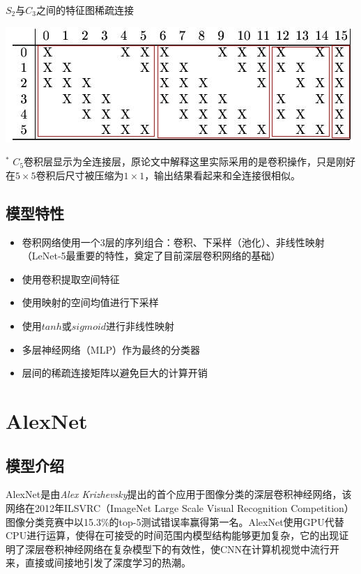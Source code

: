 \documentclass[12pt,a4paper,UTF8,twoside]{book}
\providecommand{\tightlist}{%
  \setlength{\itemsep}{0pt}\setlength{\parskip}{0pt}}
\begin{document}
\(S_2\)与\(C_3\)之间的特征图稀疏连接

\begin{center}\includegraphics[width=0.7\linewidth]{img/02-02} \end{center}

\(^*\) \(C_5\)卷积层显示为全连接层，原论文中解释这里实际采用的是卷积操作，只是刚好在\(5\times5\)卷积后尺寸被压缩为\(1\times1\)，输出结果看起来和全连接很相似。

\hypertarget{ux6a21ux578bux7279ux6027}{%
\subsection{模型特性}\label{ux6a21ux578bux7279ux6027}}

\begin{itemize}
\tightlist
\item
  卷积网络使用一个3层的序列组合：卷积、下采样（池化）、非线性映射（LeNet-5最重要的特性，奠定了目前深层卷积网络的基础）
\item
  使用卷积提取空间特征
\item
  使用映射的空间均值进行下采样
\item
  使用\(tanh\)或\(sigmoid\)进行非线性映射
\item
  多层神经网络（MLP）作为最终的分类器
\item
  层间的稀疏连接矩阵以避免巨大的计算开销
\end{itemize}

\hypertarget{alexnet}{%
\section{AlexNet}\label{alexnet}}

\hypertarget{ux6a21ux578bux4ecbux7ecd-1}{%
\subsection{模型介绍}\label{ux6a21ux578bux4ecbux7ecd-1}}

AlexNet是由\emph{Alex Krizhevsky}提出的首个应用于图像分类的深层卷积神经网络，该网络在2012年ILSVRC（ImageNet Large Scale Visual Recognition Competition）图像分类竞赛中以15.3\%的top-5测试错误率赢得第一名。AlexNet使用GPU代替CPU进行运算，使得在可接受的时间范围内模型结构能够更加复杂，它的出现证明了深层卷积神经网络在复杂模型下的有效性，使CNN在计算机视觉中流行开来，直接或间接地引发了深度学习的热潮。
\end{document}
